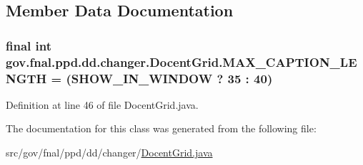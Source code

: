 \subsection{Member Data Documentation}
\hypertarget{classgov_1_1fnal_1_1ppd_1_1dd_1_1changer_1_1DocentGrid_aebf6698c77d6b3a216c185900f253373}{
\subsubsection[{M\-A\-X\-\_\-\-C\-A\-P\-T\-I\-O\-N\-\_\-\-L\-E\-N\-G\-T\-H}]{\setlength{\rightskip}{0pt plus 5cm}final int gov.\-fnal.\-ppd.\-dd.\-changer.\-Docent\-Grid.\-M\-A\-X\-\_\-\-C\-A\-P\-T\-I\-O\-N\-\_\-\-L\-E\-N\-G\-T\-H = (S\-H\-O\-W\-\_\-\-I\-N\-\_\-\-W\-I\-N\-D\-O\-W ? 35 \-: 40)\hspace{0.3cm}{\ttfamily [static]}}}\label{classgov_1_1fnal_1_1ppd_1_1dd_1_1changer_1_1DocentGrid_aebf6698c77d6b3a216c185900f253373}


Definition at line 46 of file Docent\-Grid.\-java.



The documentation for this class was generated from the following file\-:\begin{DoxyCompactItemize}
\item 
src/gov/fnal/ppd/dd/changer/\hyperlink{DocentGrid_8java}{Docent\-Grid.\-java}\end{DoxyCompactItemize}
